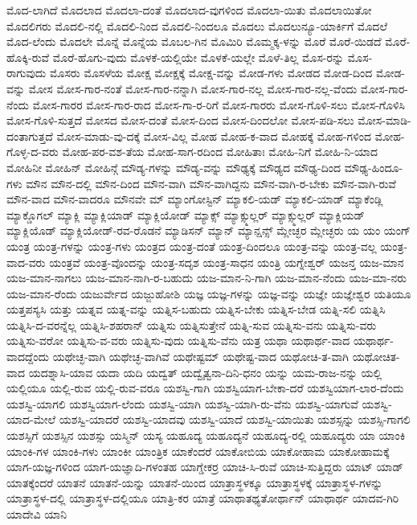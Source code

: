 {ಮೊದ-ಲಾಗಿದೆ
ಮೊದಲಾದ
ಮೊದಲಾ-ದಂತೆ
ಮೊದಲಾದ-ವುಗಳಿಂದ
ಮೊದಲಾ-ಯಿತು
ಮೊದಲಾಯಿತೋ
ಮೊದಲಿಗರು
ಮೊದಲಿ-ನಲ್ಲಿ
ಮೊದಲಿ-ನಿಂದ
ಮೊದಲಿ-ನಿಂದಲೂ
ಮೊದಲು
ಮೊದಲುನ್ಯೂ-ಯಾರ್ಕಿಗೆ
ಮೊದಲೆ
ಮೊದ-ಲೆಂದು
ಮೊದಲೇ
ಮೊನ್ನೆ
ಮೊನ್ನೆಯ
ಮೊಬಲ-ಗಿನ
ಮೊಮಿರಿ
ಮೊಮ್ಮಕ್ಕ-ಳನ್ನು
ಮೊರೆ
ಮೊರೆ-ಯಿಡದೆ
ಮೊರೆ-ಹೊಕ್ಕಿ-ರುವೆ
ಮೊರೆ-ಹೊಗು-ವುದು
ಮೊಳಕೆ-ಯಲ್ಲಿಯೇ
ಮೊಳಕೆ-ಯಲ್ಲೇ
ಮೊಳೆ-ತಿಲ್ಲ
ಮೊಸ-ರನ್ನು
ಮೊಸ-ರಾಗುವುದು
ಮೊಸರು
ಮೊಸಳೆಯ
ಮೋಕ್ಷ
ಮೋಕ್ಷಕ್ಕೆ
ಮೋಕ್ಷ-ವನ್ನು
ಮೋಡ-ಗಳು
ಮೋಡದ
ಮೋಡ-ದಿಂದ
ಮೋಡ-ವನ್ನು
ಮೋಸ
ಮೋಸ-ಗಾರ-ನಂತೆ
ಮೋಸ-ಗಾರ-ನನ್ನಾಗಿ
ಮೋಸ-ಗಾರ-ನಲ್ಲ
ಮೋಸ-ಗಾರ-ನಲ್ಲ-ವೆಂದು
ಮೋಸ-ಗಾರ-ನೆಂದು
ಮೋಸ-ಗಾರರ
ಮೋಸ-ಗಾರ-ರಾದ
ಮೋಸ-ಗಾ-ರ-ರಿಗೆ
ಮೋಸ-ಗಾರರು
ಮೋಸ-ಗೊಳಿ-ಸಲು
ಮೋಸ-ಗೊಳಿಸಿ
ಮೋಸ-ಗೊಳಿ-ಸುತ್ತದೆ
ಮೋಸದ
ಮೋಸ-ದಂತೆ
ಮೋಸ-ದಿಂದ
ಮೋಸ-ದಿಂದಲೋ
ಮೋಸ-ಪಡಿ-ಸಲು
ಮೋಸ-ಮಾಡಿ-ದಂತಾಗುತ್ತದೆ
ಮೋಸ-ಮಾಡು-ವು-ದಕ್ಕೆ
ಮೋಸ-ವಿಲ್ಲ
ಮೋಹ
ಮೋಹ-ಕ-ವಾದ
ಮೋಹಕ್ಕೆ
ಮೋಹ-ಗಳಿಂದ
ಮೋಹ-ಗೊಳ್ಳ-ದ-ವರು
ಮೋಹ-ಪರ-ವಶ-ತೆಯ
ಮೋಹ-ಸಾಗ-ರದಿಂದ
ಮೋಹಿತಾಃ
ಮೋಹಿ-ನಿಗೆ
ಮೋಹಿ-ನಿ-ಯಾದ
ಮೋಹಿನೀ
ಮೋಹಿನ್
ಮೋಹಿನ್ಗೆ
ಮೌಡ್ಯ-ಗಳನ್ನು
ಮೌಡ್ಯ-ವನ್ನು
ಮೌಢ್ಯಕ್ಕೆ
ಮೌಢ್ಯದ
ಮೌಢ್ಯ-ದಿಂದ
ಮೌಢ್ಯ-ಹಿಂದೂ-ಗಳು
ಮೌನ
ಮೌನ-ದಲ್ಲಿ
ಮೌನ-ದಿಂದ
ಮೌನ-ವಾಗಿ
ಮೌನ-ವಾಗಿದ್ದನು
ಮೌನ-ವಾಗಿ-ರ-ಬೇಕು
ಮೌನ-ವಾಗಿ-ರುವೆ
ಮೌನ-ವಾದ
ಮೌನ-ವಾದರೂ
ಮೌನವೇ
ಮ್
ಮ್ಯಾಂಗೋಸ್ಟಿನ್
ಮ್ಯಾಕಲಿ-ಯಡ್
ಮ್ಯಾಕಲಿ-ಯಾಡ್
ಮ್ಯಾಕೆಂಡ್ಲಿ
ಮ್ಯಾಕ್ಡೊಗಲ್
ಮ್ಯಾಕ್ಲಿ
ಮ್ಯಾಕ್ಲಿಯಾಡ್
ಮ್ಯಾಕ್ಲಿಯೋಡ್
ಮ್ಯಾಕ್ಸ್
ಮ್ಯಾಕ್ಸ್ಮುಲ್ಲರ್
ಮ್ಯಾಕ್ಸ್ಮುಲ್ಲರ್
ಮ್ಯಾಕ್ಲಿಯಡ್
ಮ್ಯಾಕ್ಲಿಯೊಡ್
ಮ್ಯಾಕ್ಲಿಯೋಡ್-ರವ-ರೊಡನೆ
ಮ್ಯಾಡಿಸನ್
ಮ್ಯಾನ್
ಮ್ಯಾನ್ಷನ್ಸ್
ಮ್ಲೇಚ್ಛರ
ಮ್ಲೇಚ್ಛರು
ಯ
ಯಂ
ಯಂಗ್
ಯಂತ್ರ
ಯಂತ್ರ-ಗಳನ್ನು
ಯಂತ್ರ-ಗಳು
ಯಂತ್ರದ
ಯಂತ್ರ-ದಂತೆ
ಯಂತ್ರ-ದಿಂದಲೂ
ಯಂತ್ರ-ವನ್ನು
ಯಂತ್ರ-ವಲ್ಲ
ಯಂತ್ರ-ವಾದ-ವರು
ಯಂತ್ರವೆ
ಯಂತ್ರ-ವೊಂದನ್ನು
ಯಂತ್ರ-ಸದೃಶ
ಯಂತ್ರ-ಸಾಧನ
ಯಂತ್ರಿ
ಯಗ್ನೇಶ್ವರ್
ಯಜನ್ತ
ಯಜ-ಮಾನ
ಯಜ-ಮಾನ-ನಾಗಲು
ಯಜ-ಮಾನ-ನಾಗಿ-ರ-ಬಹುದು
ಯಜ-ಮಾನ-ನಿ-ಗಾಗಿ
ಯಜ-ಮಾನ-ನೆಂದು
ಯಜ-ಮಾ-ನರು
ಯಜ-ಮಾನ-ರೆಂದು
ಯಜುರ್ವೇದ
ಯಜ್ಜುಹೋಶಿ
ಯಜ್ಞ
ಯಜ್ಞ-ಗಳನ್ನು
ಯಜ್ಞ-ವನ್ನು
ಯಜ್ಞೇ
ಯಜ್ಞೇಶ್ವರ
ಯತಿಯೂ
ಯತ್ತಪಸ್ಯಸಿ
ಯತ್ತು
ಯತ್ನವ
ಯತ್ನ-ವನ್ನು
ಯತ್ನಿಸ-ಬಹುದು
ಯತ್ನಿಸ-ಬೇಕು
ಯತ್ನಿಸ-ಬೇಡ
ಯತ್ನಿ-ಸಲಿ
ಯತ್ನಿಸಿ
ಯತ್ನಿಸಿ-ದ-ವರನ್ನೆಲ್ಲ
ಯತ್ನಿಸಿ-ಶಹರಾನ್
ಯತ್ನಿಸು
ಯತ್ನಿಸುತ್ತೇನೆ
ಯತ್ನಿ-ಸುವ
ಯತ್ನಿಸು-ವನು
ಯತ್ನಿಸು-ವರು
ಯತ್ನಿಸು-ವರೋ
ಯತ್ನಿಸು-ವ-ವರು
ಯತ್ನಿಸು-ವುದು
ಯತ್ನಿಸು-ವೆನು
ಯತ್ರ
ಯಥಾ
ಯಥಾರ್ಥ-ವಾದ
ಯಥಾರ್ಥ-ವಾದದ್ದೆಂದು
ಯಥೇಚ್ಛ-ವಾಗಿ
ಯಥೇಚ್ಛ-ವಾಗಿವೆ
ಯಥೇಷ್ಟಮ್
ಯಥೇಷ್ಟ-ವಾದ
ಯಥೋಚಿ-ತ-ವಾಗಿ
ಯಥೋಚಿತ-ವಾದ
ಯದಶ್ನಾಸಿ-ಯಾವ
ಯದಾ
ಯದಿ
ಯದ್ವತ್
ಯದ್ವೈತ್ವನಾ-ದಿನಿ-ಧನಂ
ಯನ್ನು
ಯಮ-ರಾಜ-ನನ್ನು
ಯಲ್ಲಿ
ಯಲ್ಲಿಯೂ
ಯಲ್ಲಿ-ರುವ
ಯಲ್ಲಿ-ರುವ-ವರೂ
ಯಶಸ್ವಿ-ಗಾಗಿ
ಯಶಸ್ವಿಯಾಗ-ಬೇಕಾ-ದರೆ
ಯಶಸ್ವಿಯಾಗ-ಲಾರ-ದೆಂದು
ಯಶಸ್ವಿ-ಯಾಗಲಿ
ಯಶಸ್ವಿಯಾಗ-ಲೆಂದು
ಯಶಸ್ವಿ-ಯಾಗಿ
ಯಶಸ್ವಿ-ಯಾಗಿ-ರು-ವೆನು
ಯಶಸ್ವಿ-ಯಾಗುವೆ
ಯಶಸ್ವಿ-ಯಾದ-ಮೇಲೆ
ಯಶಸ್ವಿ-ಯಾದರೆ
ಯಶಸ್ವಿ-ಯಾದವು
ಯಶಸ್ವಿ-ಯಾದೆ
ಯಶಸ್ವಿ-ಯಾಯಿತು
ಯಶಸ್ಸನ್ನು
ಯಶಸ್ಸಿ-ಗಾಗಲಿ
ಯಶಸ್ಸಿಗೆ
ಯಶಸ್ಸಿನ
ಯಶಸ್ಸು
ಯಸ್ಮಿನ್
ಯಸ್ಯ
ಯಹೂದ್ಯ
ಯಹೂದ್ಯನೆ
ಯಹೂದ್ಯ-ರಲ್ಲಿ
ಯಹೂದ್ಯರು
ಯಾ
ಯಾಂಕಿ
ಯಾಂಕಿ-ಗಳ
ಯಾಂಕಿ-ಗಳು
ಯಾಂಕೀ
ಯಾಂತ್ರಿಕ
ಯಾಕೆಂದರೆ
ಯಾಕೋಬಿಯ
ಯಾಕೋಹಾಮ
ಯಾಕೋಹಾಮಕ್ಕೆ
ಯಾಗ-ಯಜ್ಞ-ಗಳಿಂದ
ಯಾಗ-ಯಜ್ಞಾದಿ-ಗಳಂತಹ
ಯಾಗ್ಡೇಕರ್ರ
ಯಾಚಿ-ಸಿ-ರುವೆ
ಯಾಚಿ-ಸುತ್ತಿದ್ದರು
ಯಾಟ್
ಯಾಡ್
ಯಾತಕ್ಕೆಂದರೆ
ಯಾತನೆ
ಯಾತನೆ-ಯನ್ನು
ಯಾತನೆ-ಯಿಂದ
ಯಾತ್ರಾಸ್ಥಳಕ್ಕೂ
ಯಾತ್ರಾಸ್ಥಳಕ್ಕೆ
ಯಾತ್ರಾಸ್ಥಳ-ಗಳನ್ನು
ಯಾತ್ರಾಸ್ಥಳ-ದಲ್ಲಿ
ಯಾತ್ರಾಸ್ಥಳ-ದಲ್ಲಿಯೂ
ಯಾತ್ರಿ-ಕರ
ಯಾತ್ರೆ
ಯಾಥಾತಥ್ಯತೋರ್ಥಾನ್
ಯಾಥಾರ್ಥ
ಯಾದವ-ಗಿರಿ
ಯಾದೇವಿ
ಯಾನಿ
}
